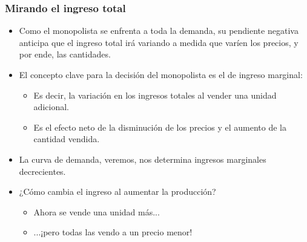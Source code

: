 \documentclass{beamer}
\begin{document}
\begin{frame}
\frametitle{Mirando el ingreso total}
\begin{itemize}
    \item Como el monopolista se enfrenta a toda la demanda, su pendiente negativa anticipa que el ingreso total irá variando a medida que varíen los precios, y por ende, las cantidades. \vspace{1mm}
    \item El concepto clave para la decisión del monopolista es el de ingreso marginal: \vspace{1mm}
    \begin{itemize}
        \item Es decir, la variación en los ingresos totales al vender una unidad adicional.
        \item Es el efecto neto de la disminución de los precios y el aumento de la cantidad vendida.\vspace{1mm}
    \end{itemize}
    \item La curva de demanda, veremos, nos determina ingresos marginales decrecientes. \vspace{1mm}
     \item ¿Cómo cambia el ingreso al aumentar la producción?
    \begin{itemize}
        \item Ahora se vende una unidad más... \\
        \item ...¡pero todas las vendo a un precio menor!
    \end{itemize}
\end{itemize}
\end{frame}
\end{document}
